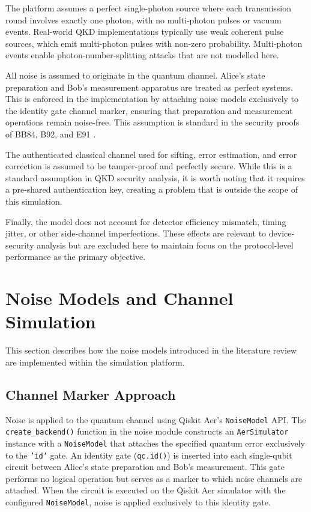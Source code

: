 \documentclass[10pt, a4paper]{report}
\begin{document}
The platform assumes a perfect single-photon source where each transmission round involves exactly one photon, with no multi-photon pulses or vacuum events. Real-world QKD implementations typically use weak coherent pulse sources, which emit multi-photon pulses with non-zero probability. Multi-photon events enable photon-number-splitting attacks that are not modelled here.

All noise is assumed to originate in the quantum channel. Alice's state preparation and Bob's measurement apparatus are treated as perfect systems. This is enforced in the implementation by attaching noise models exclusively to the identity gate channel marker, ensuring that preparation and measurement operations remain noise-free. This assumption is standard in the security proofs of BB84, B92, and E91 \cite{ShorPreskill2000, Scarani2009}.

The authenticated classical channel used for sifting, error estimation, and error correction is assumed to be tamper-proof and perfectly secure. While this is a standard assumption in QKD security analysis, it is worth noting that it requires a pre-shared authentication key, creating a problem that is outside the scope of this simulation.

Finally, the model does not account for detector efficiency mismatch, timing jitter, or other side-channel imperfections. These effects are relevant to device-security analysis but are excluded here to maintain focus on the protocol-level performance as the primary objective.


\section{Noise Models and Channel Simulation}
\label{sec:noise-impl}

This section describes how the noise models introduced in the literature review are implemented within the simulation platform.

\subsection{Channel Marker Approach}

Noise is applied to the quantum channel using Qiskit Aer's \texttt{NoiseModel} API. The \texttt{create\_backend()} function in the noise module constructs an \texttt{AerSimulator} instance with a \texttt{NoiseModel} that attaches the specified quantum error exclusively to the \texttt{'id'} gate. An identity gate (\texttt{qc.id()}) is inserted into each single-qubit circuit between Alice's state preparation and Bob's measurement. This gate performs no logical operation but serves as a marker to which noise channels are attached. When the circuit is executed on the Qiskit Aer simulator with the configured \texttt{NoiseModel}, noise is applied exclusively to this identity gate.
\end{document}
